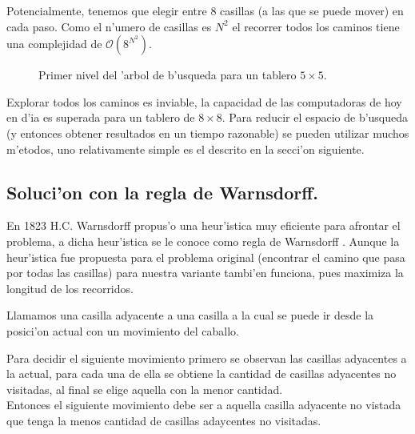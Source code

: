 \documentclass[12pt]{article}
\newcommand{\bigo}{\mathcal{O}}
\begin{document}
    Potencialmente, tenemos que elegir entre 8 casillas (a las que se puede mover) en cada paso.
    Como el n'umero de casillas es $N^2$  el recorrer todos los caminos tiene una complejidad de
    $\bigo( 8^{N^2} ) $.

    \begin{figure}[H]
        \centering
        \caption{Primer nivel del 'arbol de b'usqueda para un tablero $5 \times 5$. }
        \label{fig:tree1}
    \end{figure}

    Explorar todos los caminos es inviable, la capacidad de las  computadoras de hoy en d'ia es superada para un tablero
    de $8\times 8$. Para reducir el espacio
    de b'usqueda (y entonces obtener resultados en un tiempo razonable)
    se pueden utilizar muchos m'etodos, uno relativamente
    simple es el descrito en la secci'on siguiente.



    \subsection{Soluci'on con la regla de Warnsdorff.}
    En 1823  H.C. Warnsdorff propus'o una heur'istica muy eficiente para afrontar el problema, a dicha heur'istica se le conoce
    como regla de Warnsdorff \cite{pranav} . Aunque la heur'istica fue propuesta para el problema original (encontrar el camino que pasa por todas
    las casillas) para nuestra variante tambi'en funciona, pues maximiza la longitud de los recorridos.

    Llamamos una casilla adyacente a una casilla a la cual se puede ir desde la posici'on actual con un movimiento del caballo.

    Para decidir el siguiente movimiento primero se observan las casillas adyacentes a la actual, para cada una de ella se obtiene la
    cantidad de casillas adyacentes no visitadas, al final se elige aquella con la menor cantidad.\\
    Entonces el siguiente movimiento debe ser a
    aquella casilla adyacente no vistada que tenga la menos cantidad de casillas adaycentes no visitadas.
\end{document}

